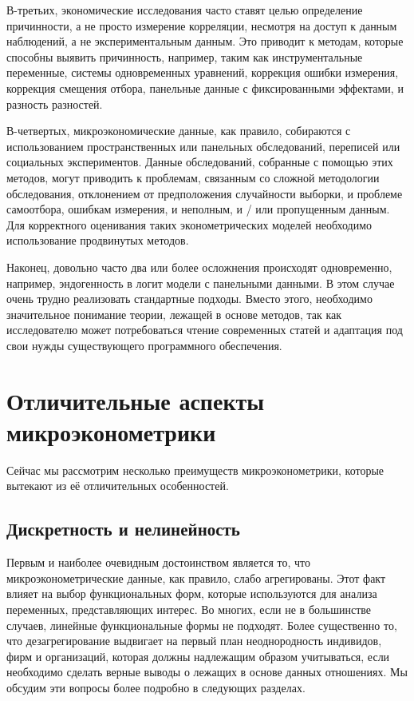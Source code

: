 	
В-третьих, экономические исследования часто ставят целью определение причинности, а не просто измерение корреляции, несмотря на доступ к данным наблюдений, а не экспериментальным данным. Это приводит к методам, которые способны выявить причинность, например, таким как инструментальные переменные, системы одновременных уравнений, коррекция ошибки измерения, коррекция смещения отбора, панельные данные с фиксированными эффектами, и разность разностей.
	
	
В-четвертых, микроэкономические данные, как правило, собираются с использованием пространственных или  панельных обследований, переписей или социальных экспериментов. Данные обследований, собранные с помощью этих методов, могут приводить к проблемам, связанным со сложной методологии обследования, отклонением от предположения случайности выборки, и проблеме самоотбора, ошибкам измерения, и неполным, и / или пропущенным данным. Для корректного оценивания таких эконометрических моделей необходимо использование продвинутых методов.
	
	
Наконец, довольно часто два или более осложнения происходят одновременно, например, эндогенность в логит модели с панельными данными. В этом случае очень трудно реализовать стандартные подходы. Вместо этого, необходимо значительное понимание теории, лежащей в основе методов, так как исследователю может потребоваться  чтение современных статей и адаптация под свои нужды существующего программного обеспечения.  


\section{Отличительные аспекты микроэконометрики}

Сейчас мы рассмотрим несколько преимуществ микроэконометрики, которые вытекают из её отличительных особенностей.

\subsection{Дискретность и нелинейность}

Первым и наиболее очевидным достоинством является то, что микроэконометрические данные, как правило, слабо агрегированы. Этот факт влияет на выбор функциональных форм, которые используются для анализа переменных, представляющих интерес. Во многих, если не в большинстве случаев, линейные функциональные формы не подходят. Более существенно то, что дезагрегирование выдвигает на первый план неоднородность индивидов, фирм и организаций, которая должны надлежащим образом учитываться, если необходимо сделать верные выводы о лежащих в основе данных отношениях. Мы обсудим эти вопросы более подробно в следующих разделах.
	
